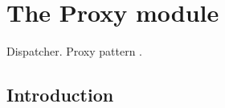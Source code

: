 \section{The Proxy module}

Dispatcher. Proxy pattern \cite{GoF}.

\subsection{Introduction}
\label{sec:proxy_introduction}



